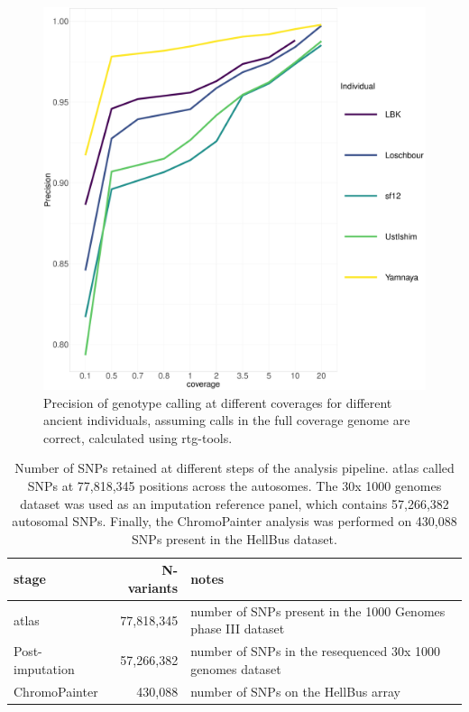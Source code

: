 {\begin{figure}[htp]
    \centering
    \includegraphics[width=1.0\textwidth]{../images/chapter1/allDownsampled_rtgtools_Precision.pdf}
    \caption{Precision of genotype calling at different coverages for different ancient individuals, assuming calls in the full coverage genome are correct,  calculated using rtg-tools.}
    \label{fig:precision_downsampled_rtgtools}
\end{figure}

\begingroup\fontsize{8}{10}\selectfont

\begin{table}
\centering\begingroup\fontsize{8}{10}\selectfont

\begin{tabular}[t]{lrl}
\toprule
stage & N-variants & notes\\
\midrule
atlas & 77,818,345 & number of SNPs present in the 1000 Genomes phase III dataset\\
Post-imputation & 57,266,382 & number of SNPs in the resequenced 30x  1000 genomes dataset\\
ChromoPainter & 430,088 & number of SNPs on the HellBus array\\
\bottomrule
\end{tabular}
\caption{Number of SNPs retained at different steps of the analysis pipeline. atlas called SNPs at 77,818,345 positions across the autosomes. The 30x 1000 genomes dataset was used as an imputation reference panel, which contains 57,266,382 autosomal SNPs. Finally, the ChromoPainter analysis was performed on 430,088 SNPs present in the HellBus dataset.}
\endgroup{}
\end{table}



}
